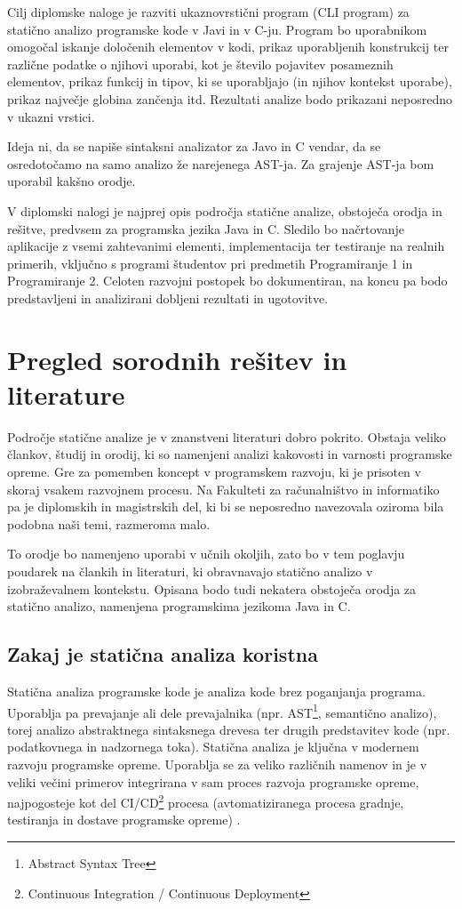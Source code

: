 \documentclass[a4paper,12pt,openright]{book}
\begin{document}
Cilj diplomske naloge je razviti ukaznovrstični program (CLI program) za statično analizo programske kode v Javi in v C-ju. Program bo uporabnikom omogočal iskanje določenih elementov v kodi, prikaz uporabljenih konstrukcij ter različne podatke o njihovi uporabi, kot je število pojavitev posameznih elementov, prikaz funkcij in tipov, ki se uporabljajo (in njihov kontekst uporabe), prikaz največje globina zančenja itd.  Rezultati analize bodo prikazani neposredno v ukazni vrstici.

Ideja ni, da se napiše sintaksni analizator za Javo in C vendar, da se osredotočamo na samo analizo že narejenega AST-ja. Za grajenje AST-ja bom uporabil kakšno orodje.

V diplomski nalogi je najprej opis področja statične analize, obstoječa orodja in rešitve, predvsem za programska jezika Java in C. Sledilo bo načrtovanje aplikacije z vsemi zahtevanimi elementi, implementacija ter testiranje na realnih primerih, vključno s programi študentov pri predmetih Programiranje 1 in Programiranje 2. Celoten razvojni postopek bo dokumentiran, na koncu pa bodo predstavljeni in analizirani dobljeni rezultati in ugotovitve.

\chapter{Pregled sorodnih rešitev in literature}
\label{ch0}

Področje statične analize je v znanstveni literaturi dobro pokrito. Obstaja veliko člankov, študij in orodij, ki so namenjeni analizi kakovosti in varnosti programske opreme. Gre za pomemben koncept v programskem razvoju, ki je prisoten v skoraj vsakem razvojnem procesu. Na Fakulteti za računalništvo in informatiko pa je diplomskih in magistrskih del, ki bi se neposredno navezovala oziroma bila podobna naši temi, razmeroma malo.

To orodje bo namenjeno uporabi v učnih okoljih, zato bo v tem poglavju poudarek na člankih in literaturi, ki obravnavajo statično analizo v izobraževalnem kontekstu. Opisana bodo tudi nekatera obstoječa orodja za statično analizo, namenjena programskima jezikoma Java in C.

\section{Zakaj je statična analiza koristna}

Statična analiza programske kode je analiza kode brez poganjanja programa. Uporablja pa prevajanje ali dele prevajalnika (npr. AST\footnote{Abstract Syntax Tree}, semantično analizo), torej analizo abstraktnega sintaksnega drevesa ter drugih predstavitev kode (npr. podatkovnega in nadzornega toka). Statična analiza je ključna v modernem razvoju programske opreme. Uporablja se za veliko različnih namenov in je v veliki večini primerov integrirana v sam proces razvoja programske opreme, najpogosteje kot del CI/CD\footnote{Continuous Integration / Continuous Deployment} procesa (avtomatiziranega procesa gradnje, testiranja in dostave programske opreme) \cite{codescene_static_analysis}.
\end{document}
